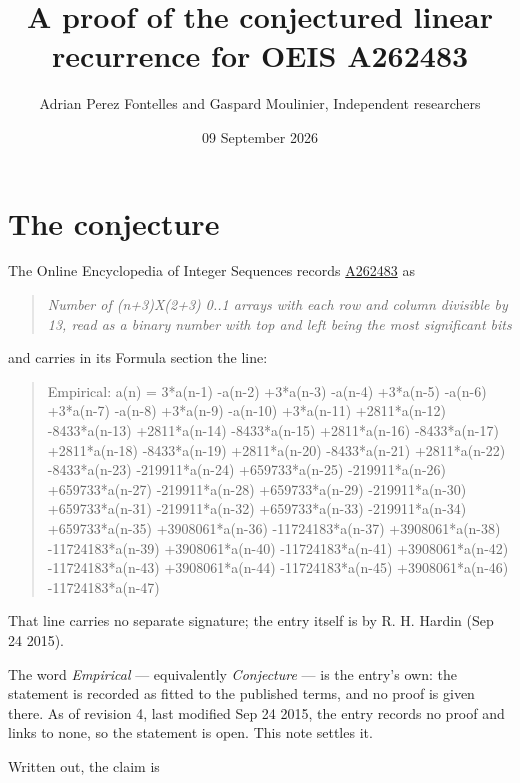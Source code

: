\documentclass[11pt]{article}
\title{A proof of the conjectured linear recurrence for OEIS A262483}
\author{Adrian Perez Fontelles and Gaspard Moulinier, Independent researchers}
\date{09 September 2026}
\theoremstyle{definition}
\begin{document}
\maketitle
\section{The conjecture}

The Online Encyclopedia of Integer Sequences records \href{https://oeis.org/A262483}{A262483} as

\begin{quote}\itshape Number of (n+3)X(2+3) 0..1 arrays with each row and column divisible by 13, read as a binary number with top and left being the most significant bits\end{quote}

and carries in its Formula section the line:

\begin{quote}\ttfamily Empirical: a(n) = 3*a(n-1) -a(n-2) +3*a(n-3) -a(n-4) +3*a(n-5) -a(n-6) +3*a(n-7) -a(n-8) +3*a(n-9) -a(n-10) +3*a(n-11) +2811*a(n-12) -8433*a(n-13) +2811*a(n-14) -8433*a(n-15) +2811*a(n-16) -8433*a(n-17) +2811*a(n-18) -8433*a(n-19) +2811*a(n-20) -8433*a(n-21) +2811*a(n-22) -8433*a(n-23) -219911*a(n-24) +659733*a(n-25) -219911*a(n-26) +659733*a(n-27) -219911*a(n-28) +659733*a(n-29) -219911*a(n-30) +659733*a(n-31) -219911*a(n-32) +659733*a(n-33) -219911*a(n-34) +659733*a(n-35) +3908061*a(n-36) -11724183*a(n-37) +3908061*a(n-38) -11724183*a(n-39) +3908061*a(n-40) -11724183*a(n-41) +3908061*a(n-42) -11724183*a(n-43) +3908061*a(n-44) -11724183*a(n-45) +3908061*a(n-46) -11724183*a(n-47)\end{quote}

That line carries no separate signature; the entry itself is by R. H. Hardin (Sep 24 2015).

The word {\itshape Empirical} --- equivalently {\itshape Conjecture} --- is the entry's own: the statement is recorded as fitted to the published terms, and no proof is given there. As of revision 4, last modified Sep 24 2015, the entry records no proof and links to none, so the statement is open. This note settles it.

Written out, the claim is
\end{document}
